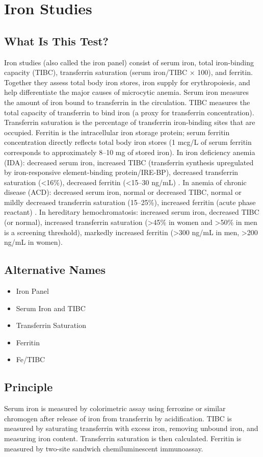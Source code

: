 \chapter{Iron Studies}
\section*{What Is This Test?}
Iron studies (also called the iron panel) consist of serum iron, total iron-binding capacity (TIBC), transferrin saturation (serum iron/TIBC $\times$ 100), and ferritin. Together they assess total body iron stores, iron supply for erythropoiesis, and help differentiate the major causes of microcytic anemia. Serum iron measures the amount of iron bound to transferrin in the circulation. TIBC measures the total capacity of transferrin to bind iron (a proxy for transferrin concentration). Transferrin saturation is the percentage of transferrin iron-binding sites that are occupied. Ferritin is the intracellular iron storage protein; serum ferritin concentration directly reflects total body iron stores (1 mcg/L of serum ferritin corresponds to approximately 8--10 mg of stored iron). In iron deficiency anemia (IDA): decreased serum iron, increased TIBC (transferrin synthesis upregulated by iron-responsive element-binding protein/IRE-BP), decreased transferrin saturation (<16\%), decreased ferritin (<15--30 ng/mL) \cite{camaschella2015iron}. In anemia of chronic disease (ACD): decreased serum iron, normal or decreased TIBC, normal or mildly decreased transferrin saturation (15--25\%), increased ferritin (acute phase reactant) \cite{ganz2019anemia}. In hereditary hemochromatosis: increased serum iron, decreased TIBC (or normal), increased transferrin saturation (>45\% in women and >50\% in men is a screening threshold), markedly increased ferritin (>300 ng/mL in men, >200 ng/mL in women).
\section*{Alternative Names}
\begin{itemize}
  \item Iron Panel
  \item Serum Iron and TIBC
  \item Transferrin Saturation
  \item Ferritin
  \item Fe/TIBC
\end{itemize}
\section*{Principle}
Serum iron is measured by colorimetric assay using ferrozine or similar chromogen after release of iron from transferrin by acidification. TIBC is measured by saturating transferrin with excess iron, removing unbound iron, and measuring iron content. Transferrin saturation is then calculated. Ferritin is measured by two-site sandwich chemiluminescent immunoassay.
